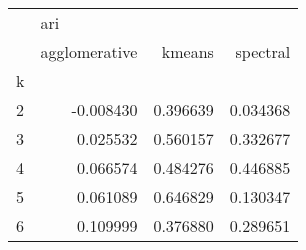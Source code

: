 \begin{tabular}{lrrr}
\toprule
{} & \multicolumn{3}{l}{ari} \\
{} & agglomerative &    kmeans &  spectral \\
k &               &           &           \\
\midrule
2 &     -0.008430 &  0.396639 &  0.034368 \\
3 &      0.025532 &  0.560157 &  0.332677 \\
4 &      0.066574 &  0.484276 &  0.446885 \\
5 &      0.061089 &  0.646829 &  0.130347 \\
6 &      0.109999 &  0.376880 &  0.289651 \\
\bottomrule
\end{tabular}
